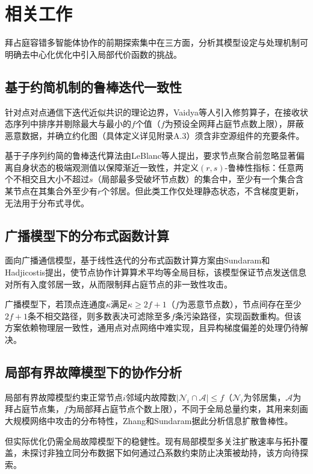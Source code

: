 \chapter{相关工作}

拜占庭容错多智能体协作的前期探索集中在三方面，分析其模型设定与处理机制可明确去中心化优化中引入局部代价函数的挑战。

\section{基于约简机制的鲁棒迭代一致性}

针对点对点通信下迭代近似共识的理论边界，Vaidya等人引入修剪算子，在接收状态序列中排序并剔除最大与最小的$f$个值（$f$为预设全网拜占庭节点数上限），屏蔽恶意数据，并确立约化图（具体定义详见附录A.3）须含非空源组件的充要条件。

基于子序列约简的鲁棒迭代算法由LeBlanc等人提出，要求节点聚合前忽略显著偏离自身状态的极端观测值以保障渐近一致性，并定义$(r,s)$-鲁棒性指标：任意两个不相交且大小不超过$s$（局部最多受破坏节点数）的集合中，至少有一个集合含某节点在其集合外至少有$r$个邻居。但此类工作仅处理静态状态，不含梯度更新，无法用于分布式寻优。

\section{广播模型下的分布式函数计算}

面向广播通信模型，基于线性迭代的分布式函数计算方案由Sundaram和Hadjicostis提出，使节点协作计算算术平均等全局目标，该模型保证节点发送信息对所有入度邻居一致，从而限制拜占庭节点的非一致性攻击。

广播模型下，若顶点连通度$\kappa$满足$\kappa \ge 2f+1$（$f$为恶意节点数），节点间存在至少$2f+1$条不相交路径，则多数表决可滤除至多$f$条污染路径，实现函数重构。但该方案依赖物理层一致性，通用点对点网络中难实现，且异构梯度偏差的处理仍待解决。

\section{局部有界故障模型下的协作分析}

局部有界故障模型约束正常节点$i$邻域内故障数$|\mathcal{N}_i \cap \mathcal{A}| \le f$（$\mathcal{N}_i$为邻居集，$\mathcal{A}$为拜占庭节点集，$f$为局部拜占庭节点个数上限），不同于全局总量约束，其用来刻画大规模网络中攻击的分布特性，Zhang和Sundaram据此分析信息扩散鲁棒性。

但实际优化仍需全局故障模型下的稳健性。现有局部模型多关注扩散速率与拓扑覆盖，未探讨非独立同分布数据下如何通过凸系数约束防止决策被劫持，该方向待探索。